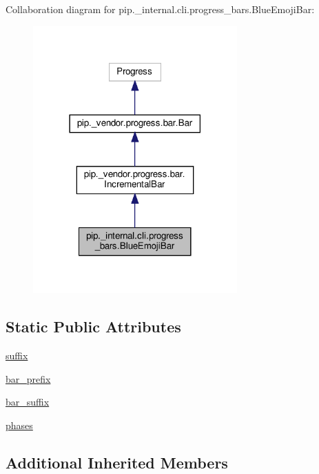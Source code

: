 Collaboration diagram for pip.\+\_\+internal.\+cli.\+progress\+\_\+bars.\+Blue\+Emoji\+Bar\+:
\nopagebreak
\begin{figure}[H]
\begin{center}
\leavevmode
\includegraphics[width=222pt]{classpip_1_1__internal_1_1cli_1_1progress__bars_1_1BlueEmojiBar__coll__graph}
\end{center}
\end{figure}
\subsection*{Static Public Attributes}
\begin{DoxyCompactItemize}
\item 
\hyperlink{classpip_1_1__internal_1_1cli_1_1progress__bars_1_1BlueEmojiBar_a16ca464d2e1de41c512490bafd1d9e25}{suffix}
\item 
\hyperlink{classpip_1_1__internal_1_1cli_1_1progress__bars_1_1BlueEmojiBar_a329db11360f981f909fd4086f9ec914b}{bar\+\_\+prefix}
\item 
\hyperlink{classpip_1_1__internal_1_1cli_1_1progress__bars_1_1BlueEmojiBar_a36b5a08a361a848824982b32f25d3526}{bar\+\_\+suffix}
\item 
\hyperlink{classpip_1_1__internal_1_1cli_1_1progress__bars_1_1BlueEmojiBar_adda67919a433fa9e00e8ddb212c09b7d}{phases}
\end{DoxyCompactItemize}
\subsection*{Additional Inherited Members}


